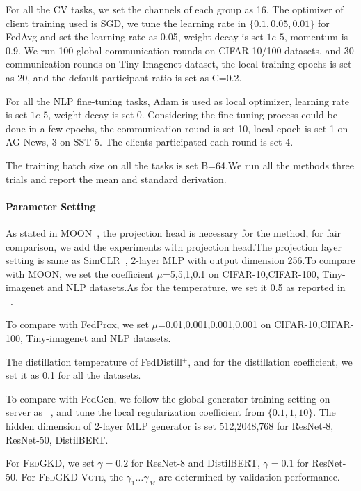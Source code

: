 \documentclass{article} %
\newcommand{\system}{\textsc{FedGKD}\xspace}
\newcommand{\systemled}{\textsc{FedGKD-Vote}\xspace}
\begin{document}
For all the CV tasks, we set the channels of each group as 16. The optimizer of client training used is SGD, we tune the learning rate in $\{0.1,0.05,0.01\}$ for  FedAvg and set the learning rate as 0.05, weight decay is set $1e\text{-}5$, momentum is 0.9. 
We run 100 global communication rounds on CIFAR-10/100 datasets, and 30 communication rounds on Tiny-Imagenet dataset, the local training epochs is set as 20, and the default participant ratio is set as C=0.2. 

For all the NLP fine-tuning tasks, Adam is used as local optimizer, learning rate is set $1e\text{-}5$, weight decay is set 0.
Considering the fine-tuning process could be done in a few epochs, the communication round is set 10, local epoch is set 1 on AG News, 3 on SST-5. The clients participated each round is set 4.

The training batch size on all the tasks is set B=64.We run all the methods three trials and report the mean and standard derivation.

\paragraph{Parameter Setting}

As stated in MOON~\citep{li2021model}, the projection head is necessary for the method, for fair comparison, we add the experiments with projection head.The projection layer setting is same as SimCLR~\citep{chen2020simple}, 2-layer MLP with output dimension 256.To compare with MOON, we set the coefficient $\mu$=5,5,1,0.1 on CIFAR-10,CIFAR-100, Tiny-imagenet and NLP datasets.As for the temperature, we set it 0.5 as reported in ~\citep{li2021model}.

To compare with FedProx, we set $\mu$=0.01,0.001,0.001,0.001 on CIFAR-10,CIFAR-100, Tiny-imagenet and NLP datasets.

The distillation temperature of FedDistill$^{+}$, and for the distillation coefficient, we set it as 0.1 for all the datasets.

To compare with FedGen, we follow the global generator training setting on server as ~\citep{zhu2021data}, and tune the local regularization coefficient from $\{0.1, 1,10\}$. The hidden dimension of 2-layer MLP generator is set 512,2048,768 for ResNet-8, ResNet-50, DistilBERT.

For \system, we set $\gamma=0.2$ for ResNet-8 and DistilBERT, $\gamma=0.1$ for ResNet-50. For \systemled, the $\gamma_1\ldots\gamma_M$ are determined by validation performance.
\end{document}
